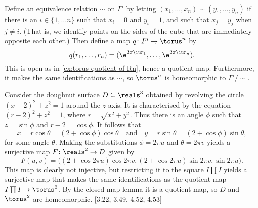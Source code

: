 \documentclass[article, a4paper, 11pt, oneside]{memoir}
\numberwithin{equation}{chapter}
\begin{document}
\begin{example}
    Define an equivalence relation $\sim$ on $I^n$ by letting $(x_1, \ldots, x_n) \sim (y_1, \ldots, y_n)$ if there is an $i \in \{1, \ldots n\}$ such that $x_i = 0$ and $y_i = 1$, and such that $x_j = y_j$ when $j \neq i$. (That is, we identify points on the sides of the cube that are immediately opposite each other.) Then define a map $q \colon I^n \to \torus^n$ by
    \begin{equation*}
        q(r_1, \ldots, r_n)
            = (\e^{2\pi \iu r_1}, \ldots, \e^{2\pi \iu r_n}).
    \end{equation*}
    This is open as in \cref{ex:torus-quotient-of-Rn}, hence a quotient map. Furthermore, it makes the same identifications as $\sim$, so $\torus^n$ is homeomorphic to $I^n/{\sim}$.
\end{example}


\begin{example}
    Consider the doughnut surface $D \subseteq \reals^3$ obtained by revolving the circle $(x-2)^2 + z^2 = 1$ around the $z$-axis. It is characterised by the equation $(r-2)^2 + z^2 = 1$, where $r = \sqrt{x^2 + y^2}$. Thus there is an angle $\phi$ such that $z = \sin\phi$ and $r-2 = \cos\phi$. It follows that
    \begin{equation*}
        x = r\cos\theta = (2 + \cos\phi) \cos\theta
        \quad \text{and} \quad
        y = r\sin\theta = (2 + \cos\phi) \sin\theta,
    \end{equation*}
    for some angle $\theta$. Making the substitutions $\phi = 2\pi u$ and $\theta = 2\pi v$ yields a surjective map $F \colon \reals^2 \to D$ given by
    \begin{equation*}
        F(u,v) = \bigl(
            (2 + \cos 2\pi u) \cos 2\pi v,
            (2 + \cos 2\pi u) \sin 2\pi v,
            \sin 2\pi u
        \bigr).
    \end{equation*}
    This map is clearly not injective, but restricting it to the square $I \prod I$ yields a surjective map that makes the same identifications as the quotient map $I \prod I \to \torus^2$. By the closed map lemma it is a quotient map, so $D$ and $\torus^2$ are homeomorphic. [3.22, 3.49, 4.52, 4.53]
\end{example}
\end{document}
